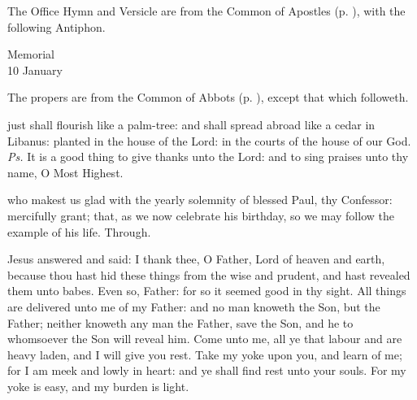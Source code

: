 \begin{rubric}
	The Office Hymn and Versicle are from the Common of Apostles (p. \pageref{CommonApostles}), with the following Antiphon.
\end{rubric}



\begin{inhead}
    {Memorial\\
10 January}
\end{inhead}

\begin{rubric}
	The propers are from the Common of Abbots (p. \pageref{CommonAbbots}), except that which followeth.
\end{rubric}

\introit
{} just shall flourish like a palm-tree: and shall spread abroad like a cedar in Libanus: planted in the house of the Lord: in the courts of the house of our God. \textit{Ps.} It is a good thing to give thanks unto the Lord: and to sing praises unto thy name, O Most Highest.

\collect
{} who makest us glad with the yearly solemnity of blessed Paul, thy Confessor: mercifully grant; that, as we now celebrate his birthday, so we may follow the example of his life. Through.


 Jesus answered and said: I thank thee, O Father, Lord of heaven and earth, because thou hast hid these things from the wise and prudent, and hast revealed them unto babes. Even so, Father: for so it seemed good in thy sight. All things are delivered unto me of my Father: and no man knoweth the Son, but the Father; neither knoweth any man the Father, save the Son, and he to whomsoever the Son will reveal him. Come unto me, all ye that labour and are heavy laden, and I will give you rest. Take my yoke upon you, and learn of me; for I am meek and lowly in heart: and ye shall find rest unto your souls. For my yoke is easy, and my burden is light.

